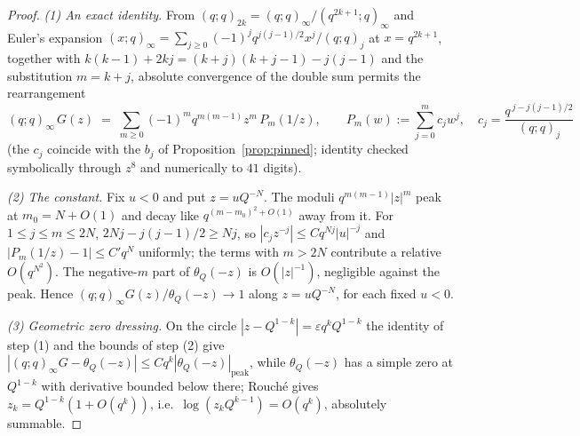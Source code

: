 \documentclass[11pt]{article}
\theoremstyle{plain}
\theoremstyle{definition}
\theoremstyle{remark}
\begin{document}
\begin{proof}
\emph{(1) An exact identity.} From $(q;q)_{2k}=(q;q)_\infty/(q^{2k+1};q)_\infty$ and Euler's
expansion $(x;q)_\infty=\sum_{j\ge0}(-1)^jq^{j(j-1)/2}x^j/(q;q)_j$ at $x=q^{2k+1}$, together with
$k(k-1)+2kj=(k+j)(k+j-1)-j(j-1)$ and the substitution $m=k+j$, absolute convergence of the double
sum permits the rearrangement
\[
   (q;q)_\infty\,G(z)\;=\;\sum_{m\ge0}(-1)^mq^{m(m-1)}z^m\,P_m(1/z),
   \qquad
   P_m(w):=\sum_{j=0}^m c_jw^j,\quad c_j=\frac{q^{\,j-j(j-1)/2}}{(q;q)_j}
\]
(the $c_j$ coincide with the $b_j$ of Proposition~\ref{prop:pinned}; identity checked symbolically
through $z^8$ and numerically to $41$ digits).

\emph{(2) The constant.} Fix $u<0$ and put $z=uQ^{-N}$. The moduli $q^{m(m-1)}|z|^m$ peak at
$m_0=N+O(1)$ and decay like $q^{(m-m_0)^2+O(1)}$ away from it. For $1\le j\le m\le 2N$,
$2Nj-j(j-1)/2\ge Nj$, so $|c_jz^{-j}|\le Cq^{Nj}|u|^{-j}$ and
$|P_m(1/z)-1|\le C'q^{N}$ uniformly; the terms with $m>2N$ contribute a relative
$O(q^{N^2})$. The negative-$m$ part of $\theta_Q(-z)$ is $O(|z|^{-1})$, negligible against the peak.
Hence $(q;q)_\infty G(z)/\theta_Q(-z)\to1$ along $z=uQ^{-N}$, for each fixed $u<0$.

\emph{(3) Geometric zero dressing.} On the circle $|z-Q^{1-k}|=\varepsilon q^kQ^{1-k}$ the identity
of step (1) and the bounds of step (2) give
$|(q;q)_\infty G-\theta_Q(-z)|\le Cq^k|\theta_Q(-z)|_{\text{peak}}$, while $\theta_Q(-z)$ has a
simple zero at $Q^{1-k}$ with derivative bounded below there; Rouch\'e gives
$z_k=Q^{1-k}(1+O(q^k))$, i.e.\ $\log(z_kQ^{k-1})=O(q^k)$, absolutely summable.


\end{proof}
\end{document}
